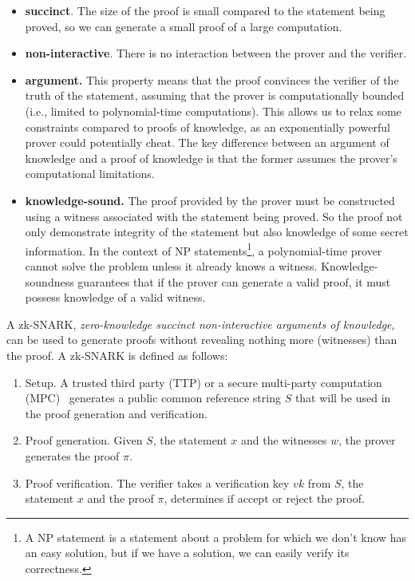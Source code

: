 \begin{itemize}
    \item \textbf{succinct}. The size of the proof is small compared to the statement being proved, so we can generate a small proof of a large computation.
    \item \textbf{non-interactive}. There is no interaction between the prover and the verifier.
    \item \textbf{argument.} This property means that the proof convinces the verifier of the truth of the statement, assuming that the prover is computationally bounded (i.e., limited to polynomial-time computations). This allows us to relax some constraints compared to proofs of knowledge, as an exponentially powerful prover could potentially cheat. The key difference between an argument of knowledge and a proof of knowledge is that the former assumes the prover's computational limitations.
    \item \textbf{knowledge-sound.} The proof provided by the prover must be constructed using a witness associated with the statement being proved. So the proof not only demonstrate integrity of the statement but also knowledge of some secret information. 
    In the context of NP statements\footnote{A NP statement is a statement about a problem for which we don't know has an easy solution, but if we have a solution, we can easily verify its correctness.}, a polynomial-time prover cannot solve the problem unless it already knows a witness. Knowledge-soundness guarantees that if the prover can generate a valid proof, it must possess knowledge of a valid witness.
\end{itemize}

A zk-SNARK, \textit{zero-knowledge succinct non-interactive arguments of knowledge}, can be used to generate proofs without revealing nothing more (witnesses) than the proof. A zk-SNARK is defined as follows:
\begin{enumerate}
    \item Setup. A trusted third party (TTP) or a secure multi-party computation (MPC)~\cite{goldreich1998secure} generates a public common reference string $S$ that will be used in the proof generation and verification.
    \item Proof generation. Given $S$, the statement $x$ and the witnesses $w$, the prover generates the proof $\pi$.
    \item Proof verification. The verifier takes a verification key $vk$ from $S$, the statement $x$ and the proof $\pi$, determines if accept or reject the proof.
\end{enumerate}

